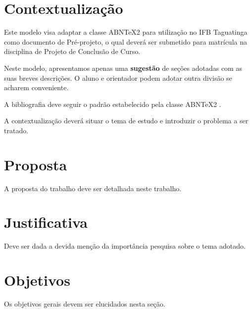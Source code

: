 \documentclass[licenciatura]{pre-projeto-computacao}
\begin{document}
\frenchspacing 
\imprimircapa
\imprimirfolhaderosto



\section*{Contextualização}
	Este modelo visa adaptar a classe ABNTeX2 para utilização no IFB Taguatinga como documento de Pré-projeto, o qual deverá ser submetido para matrícula na disciplina de Projeto de Conclusão de Curso.
	
	Neste modelo, apresentamos apenas uma \textbf{sugestão} de seções adotadas com as suas breves descrições. O aluno e orientador podem adotar outra divisão se acharem conveniente.
	
	A bibliografia deve seguir o padrão estabelecido pela classe ABNTeX2 \cite{abntex2modelo-relatorio}.
	
	A contextualização deverá situar o tema de estudo e introduzir o problema a ser tratado.

\section*{Proposta}
	A proposta do trabalho deve ser detalhada neste trabalho.

\section*{Justificativa}
	Deve ser dada a devida menção da importância pesquisa sobre o tema adotado.	
	

\section*{Objetivos}
	Os objetivos gerais devem ser elucidados nesta seção.


\end{document}
